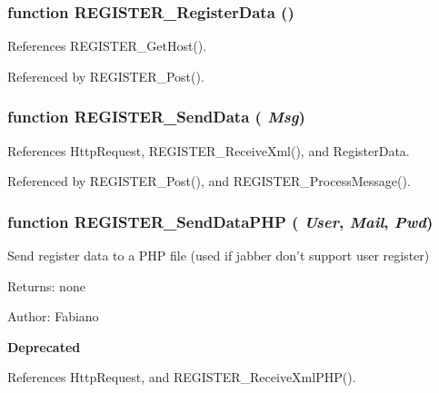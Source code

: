 \subsubsection{\setlength{\rightskip}{0pt plus 5cm}function REGISTER\_\-RegisterData ()}\label{register_8js_387c9e547a2a2c6b8bb3daa4b82e5645}




References REGISTER\_\-GetHost().

Referenced by REGISTER\_\-Post().
\subsubsection{\setlength{\rightskip}{0pt plus 5cm}function REGISTER\_\-SendData ( {\em Msg})}\label{register_8js_fcb0616848b3086105c609ff09fb56c2}




References HttpRequest, REGISTER\_\-ReceiveXml(), and RegisterData.

Referenced by REGISTER\_\-Post(), and REGISTER\_\-ProcessMessage().
\subsubsection{\setlength{\rightskip}{0pt plus 5cm}function REGISTER\_\-SendDataPHP ( {\em User}, \/   {\em Mail}, \/   {\em Pwd})}\label{register_8js_6785efd4f9728ecdfca686884a471657}


Send register data to a PHP file (used if jabber don't support user register) \begin{Desc}
\item[Returns:]none\end{Desc}
\begin{Desc}
\item[Author:]Fabiano\end{Desc}
\begin{Desc}
\item[{\bf Deprecated}]\end{Desc}


References HttpRequest, and REGISTER\_\-ReceiveXmlPHP().
